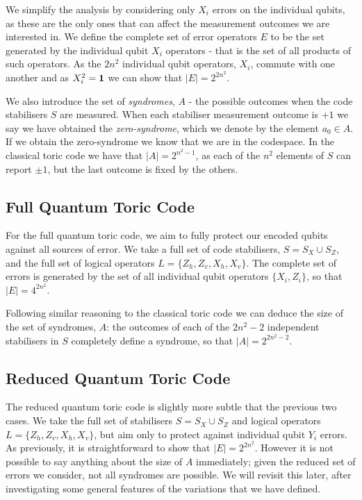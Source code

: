 We simplify the analysis by considering only $X_i$ errors on the individual qubits, as these are the only ones that can affect the measurement outcomes we are interested in. We define the complete set of error operators $E$ to be the set generated by the individual qubit $X_i$ operators - that is the set of all products of such operators. As the $2n^2$ individual qubit operators, $X_i$, commute with one another and as $X_i^2 = \mathbf{1}$ we can show that $|E| = 2^{2n^2}$.

We also introduce the set of \textit{syndromes}, $A$ - the possible outcomes when the code stabilisers $S$ are measured. When each stabiliser measurement outcome is $+1$ we say we have obtained the \textit{zero-syndrome}, which we denote by the element $a_0 \in A$. If we obtain the zero-syndrome we know that we are in the codespace. In the classical toric code we have that $|A| = 2^{n^2-1}$, as each of the $n^2$ elements of $S$ can report $\pm 1$, but the last outcome is fixed by the others.

\subsection{Full Quantum Toric Code}

For the full quantum toric code, we aim to fully protect our encoded qubits against all sources of error. We take a full set of code stabilisers, $S = S_X \cup S_Z$, and the full set of logical operators $L = \{Z_h, Z_v, X_h, X_v\}$. The complete set of errors is generated by the set of all individual qubit operators $\{X_i, Z_i\}$, so that $|E| = 4^{2n^2}$.

Following similar reasoning to the classical toric code we can deduce the size of the set of syndromes, $A$: the outcomes of each of the $2n^2 - 2$ independent stabilisers in $S$ completely define a syndrome, so that $|A| = 2^{2n^2-2}$.

\subsection{Reduced Quantum Toric Code}

The reduced quantum toric code is slightly more subtle that the previous two cases. We take the full set of stabilisers $S = S_X \cup S_Z$ and logical operators $L = \{Z_h, Z_v, X_h, X_v\}$, but aim only to protect against individual qubit $Y_i$ errors. As previously, it is straightforward to show that $|E| = 2^{2n^2}$. However it is not possible to say anything about the size of $A$ immediately; given the reduced set of errors we consider, not all syndromes are possible. We will revisit this later, after investigating some general features of the variations that we have defined.

